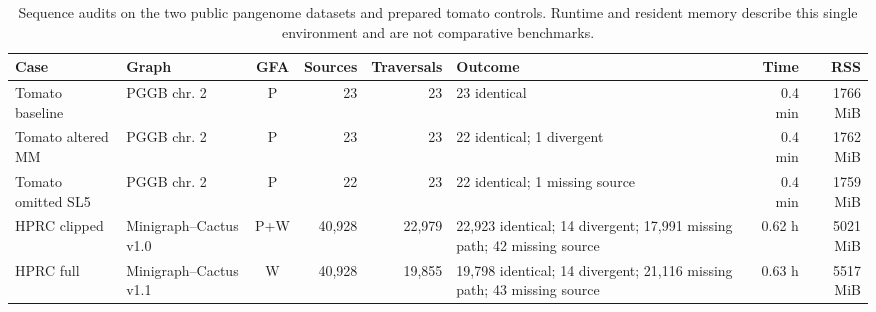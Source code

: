 \begin{table}[t]
\centering
\caption{Sequence audits on the two public pangenome datasets and prepared tomato controls. Runtime and resident memory describe this single \EnvPlatform{} environment and are not comparative benchmarks.}
\label{tab:results}
\small
\begin{tabularx}{\textwidth}{@{}l l c r r X r r@{}}
\toprule
Case & Graph & GFA & Sources & Traversals & Outcome & Time & RSS \\
\midrule
Tomato baseline & PGGB chr. 2 & P & 23 & 23 & 23 identical & 0.4 min & 1766 MiB \\
Tomato altered MM & PGGB chr. 2 & P & 23 & 23 & 22 identical; 1 divergent & 0.4 min & 1762 MiB \\
Tomato omitted SL5 & PGGB chr. 2 & P & 22 & 23 & 22 identical; 1 missing source & 0.4 min & 1759 MiB \\
HPRC clipped & Minigraph--Cactus v1.0 & P+W & 40,928 & 22,979 & 22,923 identical; 14 divergent; 17,991 missing path; 42 missing source & 0.62 h & 5021 MiB \\
HPRC full & Minigraph--Cactus v1.1 & W & 40,928 & 19,855 & 19,798 identical; 14 divergent; 21,116 missing path; 43 missing source & 0.63 h & 5517 MiB \\
\bottomrule
\end{tabularx}
\end{table}
